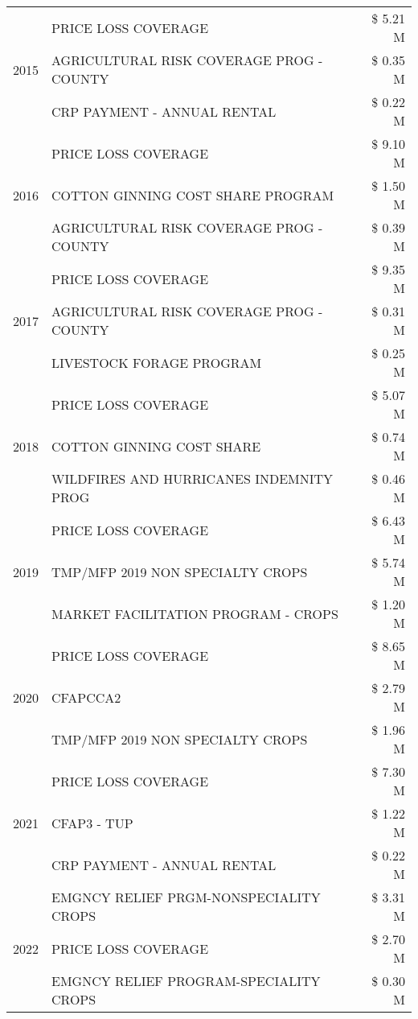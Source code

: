 \begin{tabular}{llr}
\cline{1-3}
\multirow[t]{3}{*}{2015} & PRICE LOSS COVERAGE & \$ 5.21 M \\
 & AGRICULTURAL RISK COVERAGE PROG - COUNTY & \$ 0.35 M \\
 & CRP PAYMENT - ANNUAL RENTAL & \$ 0.22 M \\
\cline{1-3}
\multirow[t]{3}{*}{2016} & PRICE LOSS COVERAGE & \$ 9.10 M \\
 & COTTON GINNING COST SHARE PROGRAM & \$ 1.50 M \\
 & AGRICULTURAL RISK COVERAGE PROG - COUNTY & \$ 0.39 M \\
\cline{1-3}
\multirow[t]{3}{*}{2017} & PRICE LOSS COVERAGE & \$ 9.35 M \\
 & AGRICULTURAL RISK COVERAGE PROG - COUNTY & \$ 0.31 M \\
 & LIVESTOCK FORAGE PROGRAM & \$ 0.25 M \\
\cline{1-3}
\multirow[t]{3}{*}{2018} & PRICE LOSS COVERAGE & \$ 5.07 M \\
 & COTTON GINNING COST SHARE & \$ 0.74 M \\
 & WILDFIRES AND HURRICANES INDEMNITY PROG & \$ 0.46 M \\
\cline{1-3}
\multirow[t]{3}{*}{2019} & PRICE LOSS COVERAGE & \$ 6.43 M \\
 & TMP/MFP 2019 NON SPECIALTY CROPS & \$ 5.74 M \\
 & MARKET FACILITATION PROGRAM - CROPS & \$ 1.20 M \\
\cline{1-3}
\multirow[t]{3}{*}{2020} & PRICE LOSS COVERAGE & \$ 8.65 M \\
 & CFAPCCA2 & \$ 2.79 M \\
 & TMP/MFP 2019 NON SPECIALTY CROPS & \$ 1.96 M \\
\cline{1-3}
\multirow[t]{3}{*}{2021} & PRICE LOSS COVERAGE & \$ 7.30 M \\
 & CFAP3 - TUP & \$ 1.22 M \\
 & CRP PAYMENT - ANNUAL RENTAL & \$ 0.22 M \\
\cline{1-3}
\multirow[t]{3}{*}{2022} & EMGNCY RELIEF PRGM-NONSPECIALITY CROPS & \$ 3.31 M \\
 & PRICE LOSS COVERAGE & \$ 2.70 M \\
 & EMGNCY RELIEF PROGRAM-SPECIALITY CROPS & \$ 0.30 M \\
\cline{1-3}
\bottomrule
\end{tabular}
